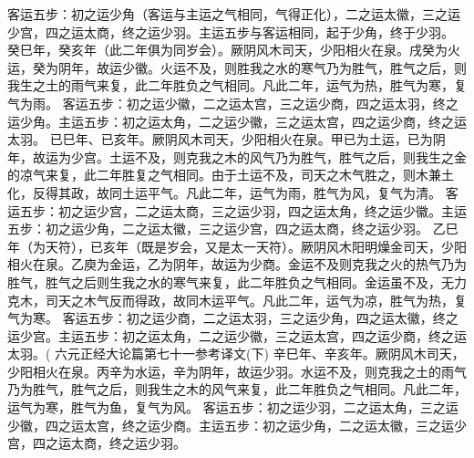 \documentclass[12pt,UTF8]{ctexbook}
\begin{document}
客运五步：初之运少角（客运与主运之气相同，气得正化），二之运太徽，三之运少宫，四之运太商，终之运少羽。主运五步与客运相同，起于少角，终于少羽。
癸巳年，癸亥年（此二年俱为同岁会）。厥阴风木司天，少阳相火在泉。戌癸为火运，癸为阴年，故运少徽。火运不及，则胜我之水的寒气乃为胜气，胜气之后，则我生之土的雨气来复，此二年胜负之气相同。凡此二年，运气为热，胜气为寒，复气为雨。
客运五步：初之运少徽，二之运太宫，三之运少商，四之运太羽，终之运少角。主运五步：初之运太角，二之运少徽，三之运太宫，四之运少商，终之运太羽。
已巳年、已亥年。厥阴风木司天，少阳相火在泉。甲已为土运，已为阴年，故运为少宫。土运不及，则克我之木的风气乃为胜气，胜气之后，则我生之金的凉气来复，此二年胜复之气相同。由于土运不及，司天之木气胜之，则木兼土化，反得其政，故同土运平气。凡此二年，运气为雨，胜气为风，复气为清。
客运五步：初之运少宫，二之运太商，三之运少羽，四之运太角，终之运少徽。主运五步：初之运少角，二之运太徽，三之运少宫，四之运太商，终之运少羽。
乙巳年（为天符），已亥年（既是岁会，又是太一天符）。厥阴风木阳明燥金司天，少阳相火在泉。乙庾为金运，乙为阴年，故运为少商。金运不及则克我之火的热气乃为胜气，胜气之后则生我之水的寒气来复，此二年胜负之气相同。金运虽不及，无力克木，司天之木气反而得政，故同木运平气。凡此二年，运气为凉，胜气为热，复气为寒。
客运五步：初之运少商，二之运太羽，三之运少角，四之运太徽，终之运少宫。主运五步：初之运太角，二之运少徽，三之运太宫，四之运少商，终之运太羽。(
六元正经大论篇第七十一参考译文(下)
辛巳年、辛亥年。厥阴风木司天，少阳相火在泉。丙辛为水运，辛为阴年，故运少羽。水运不及，则克我之土的雨气乃为胜气，胜气之后，则我生之木的风气来复，此二年胜负之气相同。凡此二年，运气为寒，胜气为鱼，复气为风。
客运五步：初之运少羽，二之运太角，三之运少徽，四之运太宫，终之运少商。主运五步：初之运少角，二之运太徽，三之运少宫，四之运太商，终之运少羽。
\end{document}
